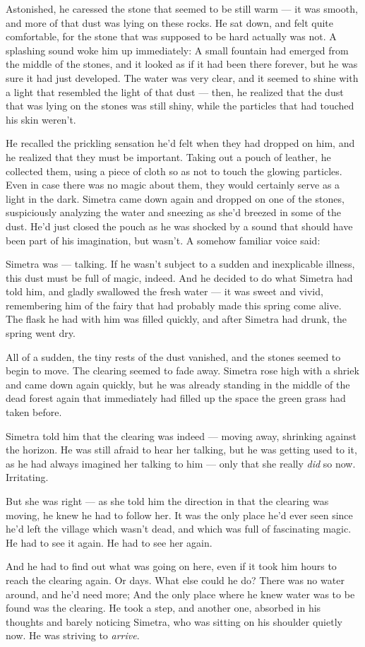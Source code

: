 Astonished, he caressed the stone that seemed to be still warm --- it was smooth, and more of that dust was lying on these rocks. He sat down, and felt quite comfortable, for the stone that was supposed to be hard actually was not.
A splashing sound woke him up immediately: A small fountain had emerged from the middle of the stones, and it looked as if it had been there forever, but he was sure it had just developed. 
The water was very clear, and it seemed to shine with a light that resembled the light of that dust --- then, he realized that the dust that was lying on the stones was still shiny, while the particles that had touched his skin weren't.

He recalled the prickling sensation he'd felt when they had dropped on him, and he realized that they must be important. Taking out a pouch of leather, he collected them, using a piece of cloth so as not to touch the glowing particles. Even in case there was no magic about them, they would certainly serve as a light in the dark. 
Simetra came down again and dropped on one of the stones, suspiciously analyzing the water and sneezing as she'd breezed in some of the dust. 
He'd just closed the pouch as he was shocked by a sound that should have been part of his imagination, but wasn't. A somehow familiar voice said: 

Simetra was --- talking.
If he wasn't subject to a sudden and inexplicable illness, this dust must be full of magic, indeed. 
And he decided to do what Simetra had told him, and gladly swallowed the fresh water --- it was sweet and vivid, remembering him of the fairy that had probably made this spring come alive. The flask he had with him was filled quickly, and after Simetra had drunk, the spring went dry.

All of a sudden, the tiny rests of the dust vanished, and the stones seemed to begin to move. The clearing seemed to fade away. 
Simetra rose high with a shriek and came down again quickly, but he was already standing in the middle of the dead forest again that immediately had filled up the space the green grass had taken before.

Simetra told him that the clearing was indeed --- moving away, shrinking against the horizon.
He was still afraid to hear her talking, but he was getting used to it, as he had always imagined her talking to him --- only that she really \emph{did} so now. Irritating.

But she was right --- as she told him the direction in that the clearing was moving, he knew he had to follow her. It was the only place he'd ever seen since he'd left the village which wasn't dead, and which was full of fascinating magic. 
He had to see it again. 
He had to see her again.

And he had to find out what was going on here, even if it took him hours to reach the clearing again. Or days. 
What else could he do? There was no water around, and he'd need more; And the only place where he knew water was to be found was the clearing. 
He took a step, and another one, absorbed in his thoughts and barely noticing Simetra, who was sitting on his shoulder quietly now. 
He was striving to \emph{arrive}. 
